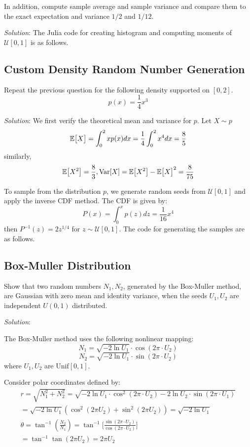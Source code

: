 \documentclass{article}
\begin{document}
In addition, compute sample average and sample variance and compare them to the exact expectation and variance $1/2$ and $1/12$.

\emph{Solution}: The Julia code for creating histogram and computing moments of $\mathcal{U}[0,1]$ is as follows.


\subsection{Custom Density Random Number Generation} \indent \indent Repeat the previous question for the following density supported on $[0,2]$.
$$
    p(x) = \frac14x^3
$$

\emph{Solution}: We first verify the theoretical mean and variance for $p$. Let $X\sim p$
$$
    \mathbb{E}\big[ {X} \big] = \int_0^2xp(x)dx = \frac14\int_0^2x^4dx = \frac85
$$ similarly, 
$$
    \mathbb{E}\big[ {X^2} \big] = \frac83, \text{Var}[X] = \mathbb{E}\big[ {X^2} \big] - \mathbb{E}\big[ {X} \big]^2 = \frac{8}{75}
$$

To sample from the distribution $p$, we generate random seeds from $\mathcal{U}[0,1]$ and apply the inverse CDF method. The CDF is given by:
$$
    P(x) = \int_0^xp(z)dz = \frac{1}{16}x^4
$$ then $P^{-1}(z) = 2z^{1/4}$ for $z\sim \mathcal{U}[0,1]$. The code for generating the samples are as follows.


\subsection{Box-Muller Distribution} Show that two random numbers $N_1, N_2$, generated by the Box-Muller method, are Gaussian with zero mean and identity variance, when the seeds $U_1,U_2$ are independent $U(0,1)$ distributed. 

\emph{Solution}:

The Box-Muller method uses the following nonlinear mapping:
$$
    N_1 = \sqrt{-2\ln U_1}\cdot \cos(2\pi \cdot U_2)
$$
$$
    N_2 = \sqrt{-2\ln U_1}\cdot \sin(2\pi \cdot U_2)
$$ where $U_1,U_2$ are $\text{Unif}[0,1]$.

Consider polar coordinates defined by:
\begin{eqnarray*}
    r = \sqrt{N_1^2 + N_2^2} = \sqrt{-2\ln U_1\cdot \cos^2(2\pi \cdot U_2) - 2\ln U_2 \cdot \sin(2\pi \cdot U_1)} \\
    = 
    \sqrt{-2\ln U_1}(\cos^2(2\pi U_2) + \sin^2(2\pi U_2)) = \sqrt{-2\ln U_1}\\
    \theta = \tan^{-1}(\frac{N_2}{N_1}) = \tan^{-1}\bigg[
        \frac{\sin(2\pi \cdot U_2)}{\cos(2\pi\cdot U_2)}
    \bigg] \\
    = \tan^{-1}\tan(2\pi U_2) = 2\pi U_2
\end{eqnarray*}
\end{document}
